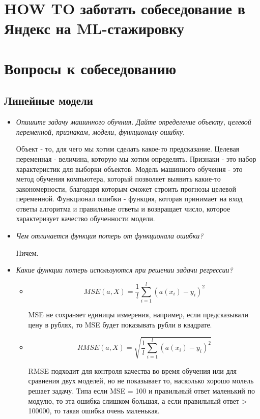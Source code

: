 \documentclass[a4paper]{article}
\author{Васильев Павел}
\begin{document}
\section*{HOW TO заботать собеседование в Яндекс на ML-стажировку}

\section*{Вопросы к собеседованию}

\subsection*{Линейные модели}

\begin{itemize}

\item \textit{Опишите задачу машинного обучния. Дайте определение объекту, целевой переменной, признакам, модели, функционалу ошибку}.

Объект - то, для чего мы хотим сделать какое-то предсказание. Целевая переменная - величина, которую мы хотим определять. Признаки - это набор характеристик для выборки объектов. Модель машинного обучения - это метод обучения компьютера, который позволяет выявить какие-то закономерности, благодаря которым сможет строить прогнозы целевой переменной. Функционал ошибки - функция, которая принимает на вход ответы алгоритма и правильные ответы и возвращает число, которое характеризует качество обученности модели.

\item \textit{Чем отличается функция потерь от функционала ошибки?}

Ничем.

\item \textit{Какие функции потерь используются при решении задачи регрессии?}

\begin{itemize}
\item \[ MSE(a, X) = \frac{1}{l} \sum_{i=1}^l (a(x_i) - y_i)^2 \]

MSE не сохраняет единицы измерения, например, если предсказывали цену в рублях, то MSE будет показывать рубли в квадрате.

\item \[ RMSE(a, X) = \sqrt{ \frac{1}{l} \sum_{i=1}^l (a(x_i) - y_i)^2 }\]

RMSE подходит для контроля качества во время обучения или для сравнения двух моделей, но не показывает то, насколько хорошо молель решает задачу. Типа если MSE = 100 и правильный ответ маленький по модулю, то эта ошибка слишком большая, а если правильный ответ > 100000, то такая ошибка очень маленькая.


\end{itemize}
\end{itemize}
\end{document}
